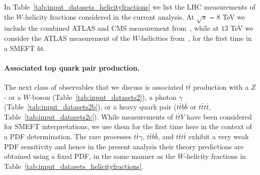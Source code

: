 \documentclass[withindex,glossary]{cam-thesis}
\begin{document}
In Table~\ref{tab:input_datasets_helicityfractions} we list
the LHC measurements of the $W$-helicity fractions considered in the current analysis.
%
At $\sqrt{s}=8$ TeV we include the combined ATLAS and CMS measurement from~\cite{Aad:2020jvx},
while at $13$ TeV we consider the ATLAS measurement of the $W$-helicities from~\cite{ATLAS:2022bdg},
for the first time in a SMEFT fit.



\paragraph{Associated top quark pair production.}
%
The next class of observables that we discuss is associated $t\bar{t}$ production with a $Z$- or a $W$-boson (Table~\ref{tab:input_datasets2}), a photon $\gamma$ (Table~\ref{tab:input_datasets2b}), or a heavy quark pair ($t\bar{t}b\bar{b}$ or $t\bar{t}t\bar{t}$, Table~\ref{tab:input_datasets2c}).
%
While measurements of $t\bar{t}V$ have been considered for SMEFT interpretations,
we use them for the first time here in the context of a PDF determination.
%
The rare processes $t\bar{t}\gamma$, $t\bar{t}b\bar{b}$, and $t\bar{t}t\bar{t}$ exhibit
a very weak PDF sensitivity and hence in the present analysis their theory predictions
are obtained using a fixed PDF, in the same manner as the $W$-helicity fractions
in Table~\ref{tab:input_datasets_helicityfractions}.






\end{document}
